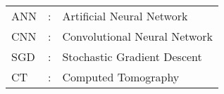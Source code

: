 \begin{tabular}{lcl}
ANN                 &:     & Artificial Neural Network \\
CNN                 &:     & Convolutional Neural Network \\
SGD                 &:     & Stochastic Gradient Descent \\
CT                  &:     & Computed Tomography \\
\end{tabular}